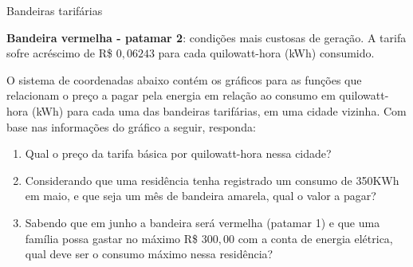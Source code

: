 \begin{task}{Bandeiras tarifárias}
\begin{itemize}
\textbf{Bandeira vermelha - patamar 2}: condições mais custosas de geração. A tarifa sofre acréscimo de R\$ $0{,}06243$ para cada quilowatt-hora (kWh) consumido.
\end{itemize}


\justify
O sistema de coordenadas abaixo contém os gráficos para as funções que relacionam o preço a pagar pela energia em relação ao consumo em quilowatt-hora (kWh) para cada uma das bandeiras tarifárias, em uma cidade vizinha. Com base nas informações do gráfico a seguir, responda:

\begin{figure}[H]
\centering

\end{figure}

\begin{enumerate}
\item Qual o preço da tarifa básica por quilowatt-hora nessa cidade?
\item Considerando que uma residência tenha registrado um consumo de 350KWh em maio, e que seja um mês de bandeira amarela, qual o valor a pagar?
\item Sabendo que em junho a bandeira será vermelha (patamar 1) e que uma família possa gastar no máximo R\$ $300{,}00$ com a conta de energia elétrica, qual deve ser o consumo máximo nessa residência?
\end{enumerate}

\end{task}

